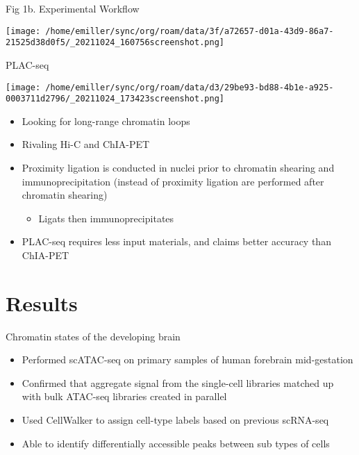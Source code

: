 \documentclass[bigger]{beamer}
\begin{document}
\begin{frame}[label={sec:org8466c6e}]{Fig 1b. Experimental Workflow}
\begin{center}
\texttt{[image: /home/emiller/sync/org/roam/data/3f/a72657-d01a-43d9-86a7-21525d38d0f5/\_20211024\_160756screenshot.png]}
\end{center}
\end{frame}

\begin{frame}[label={sec:orgd35ea48}]{PLAC-seq}
\begin{center}
\texttt{[image: /home/emiller/sync/org/roam/data/d3/29be93-bd88-4b1e-a925-0003711d2796/\_20211024\_173423screenshot.png]}
\end{center}

\begin{itemize}
\item Looking for long-range chromatin loops
\item Rivaling Hi-C and ChIA-PET
\item Proximity ligation is conducted in nuclei prior to chromatin shearing and
immunoprecipitation (instead of proximity ligation are performed after
chromatin shearing)
\begin{itemize}
\item Ligats \alert{then} immunoprecipitates
\end{itemize}
\item PLAC-seq requires less input materials, and claims better accuracy than ChIA-PET
\end{itemize}
\end{frame}

\section{Results}
\label{sec:orgd8a259d}
\begin{frame}[label={sec:orgbbcd11b}]{Chromatin states of the developing brain}
\begin{itemize}
\item Performed scATAC-seq on primary samples of human forebrain mid-gestation
\item Confirmed that aggregate signal from the single-cell libraries matched up with
bulk ATAC-seq libraries created in parallel
\item Used CellWalker to assign cell-type labels based on previous scRNA-seq
\item Able to identify differentially accessible peaks between \alert{sub} types of cells
\end{itemize}
\end{frame}
\end{document}

